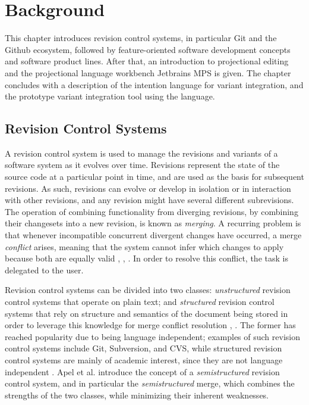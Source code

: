 \chapter{Background}

This chapter introduces revision control systems, in particular Git and the Github ecosystem, followed by feature-oriented software development concepts and software product lines. After that, an introduction to projectional editing and the projectional language workbench Jetbrains MPS is given. The chapter concludes with a description of the intention language for variant integration, and the prototype variant integration tool using the language.

\section{Revision Control Systems}
A revision control system is used to manage the revisions and variants of a software system as it evolves over time. Revisions represent the state of the source code at a particular point in time, and are used as the basis for subsequent revisions. As such, revisions can evolve or develop in isolation or in interaction with other revisions, and any revision might have several different subrevisions. The operation of combining functionality from diverging revisions, by combining their changesets into a new revision, is known as \textit{merging}. A recurring problem is that whenever incompatible concurrent divergent changes have occurred, a merge \textit{conflict} arises, meaning that the system cannot infer which changes to apply because both are equally valid \cite{mens2002}, \cite{apel2011}, \cite{buckley2005}. In order to resolve this conflict, the task is delegated to the user.

Revision control systems can be divided into two classes: \textit{unstructured} revision control systems that operate on plain text; and \textit{structured} revision control systems that rely on structure and semantics of the document being stored in order to leverage this knowledge for merge conflict resolution \cite{mens2002}, \cite{apel2011}. The former has reached popularity due to being language independent; examples of such revision control systems include Git, Subversion, and CVS, while structured revision control systems are mainly of academic interest, since they are not language independent \cite{apel2011}. Apel et al. \cite{apel2011} introduce the concept of a \textit{semistructured} revision control system, and in particular the \textit{semistructured} merge, which combines the strengths of the two classes, while minimizing their inherent weaknesses.


